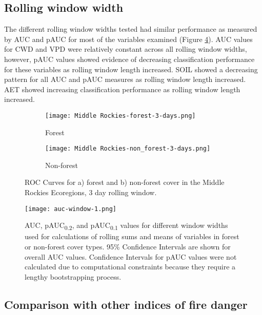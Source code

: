 \documentclass[11p]{article}
\newcommand{\pauc}[1]{pAUC\textsubscript{#1}}
\begin{document}
\subsection{Rolling window width}

The different rolling window widths tested had similar performance as measured by AUC and pAUC for most of the variables examined (Figure \ref{fig:auc_window}). AUC values for CWD and VPD were relatively constant across all rolling window widths, however, pAUC values showed evidence of decreasing classification performance for these variables as rolling window length increased. SOIL showed a decreasing pattern for all AUC and pAUC measures as rolling window length increased. AET showed increasing classification performance as rolling window length increased.  

\begin{figure}[!hbp]
  \centering
    \begin{subfigure}{.5\textwidth}
    \centering
    \texttt{[image: Middle Rockies-forest-3-days.png]}
    \caption{Forest}
    \label{fig:mr-f-auc}
  \end{subfigure}%
  \begin{subfigure}{.5\textwidth}
    \centering
    \texttt{[image: Middle Rockies-non\_forest-3-days.png]}
    \caption{Non-forest}
    \label{fig:mr-nf-auc}
  \end{subfigure}
  \caption{ROC Curves for a) forest and b) non-forest cover in the Middle Rockies Ecoregions, 3 day rolling window.}
  \label{fig:auc}
\end{figure}

\begin{figure}[htbp]
  \centering
  \texttt{[image: auc-window-1.png]}
  \caption{AUC, \pauc{0.2}, and \pauc{0.1} values for different window widths used for calculations of rolling sums and means of variables in forest or non-forest cover types. 95\% Confidence Intervals are shown for overall AUC values. Confidence Intervals for pAUC values were not calculated due to computational constraints because they require a lengthy bootstrapping process.}
  \label{fig:auc_window}
\end{figure}

\subsection{Comparison with other indices of fire danger}
\end{document}
